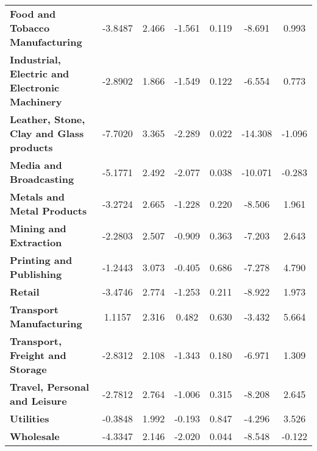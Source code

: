 \documentclass[ 11pt]{article}
\begin{document}
\begin{center}
\begin{longtable}{lcccccc}
\textbf{Food and Tobacco Manufacturing}                    &      -3.8487  &        2.466     &    -1.561  &         0.119        &       -8.691    &        0.993     \\
\textbf{Industrial, Electric and Electronic Machinery}     &      -2.8902  &        1.866     &    -1.549  &         0.122        &       -6.554    &        0.773     \\
\textbf{Leather, Stone, Clay and Glass products}           &      -7.7020  &        3.365     &    -2.289  &         0.022        &      -14.308    &       -1.096     \\
\textbf{Media and Broadcasting}                            &      -5.1771  &        2.492     &    -2.077  &         0.038        &      -10.071    &       -0.283     \\
\textbf{Metals and Metal Products}                         &      -3.2724  &        2.665     &    -1.228  &         0.220        &       -8.506    &        1.961     \\
\textbf{Mining and Extraction}                             &      -2.2803  &        2.507     &    -0.909  &         0.363        &       -7.203    &        2.643     \\
\textbf{Printing and Publishing}                           &      -1.2443  &        3.073     &    -0.405  &         0.686        &       -7.278    &        4.790     \\
\textbf{Retail}                                            &      -3.4746  &        2.774     &    -1.253  &         0.211        &       -8.922    &        1.973     \\
\textbf{Transport Manufacturing}                           &       1.1157  &        2.316     &     0.482  &         0.630        &       -3.432    &        5.664     \\
\textbf{Transport, Freight and Storage}                    &      -2.8312  &        2.108     &    -1.343  &         0.180        &       -6.971    &        1.309     \\
\textbf{Travel, Personal and Leisure}                      &      -2.7812  &        2.764     &    -1.006  &         0.315        &       -8.208    &        2.645     \\
\textbf{Utilities}                                         &      -0.3848  &        1.992     &    -0.193  &         0.847        &       -4.296    &        3.526     \\
\textbf{Wholesale}                                         &      -4.3347  &        2.146     &    -2.020  &         0.044        &       -8.548    &       -0.122     \\

\end{longtable}
\end{center}
\end{document}

